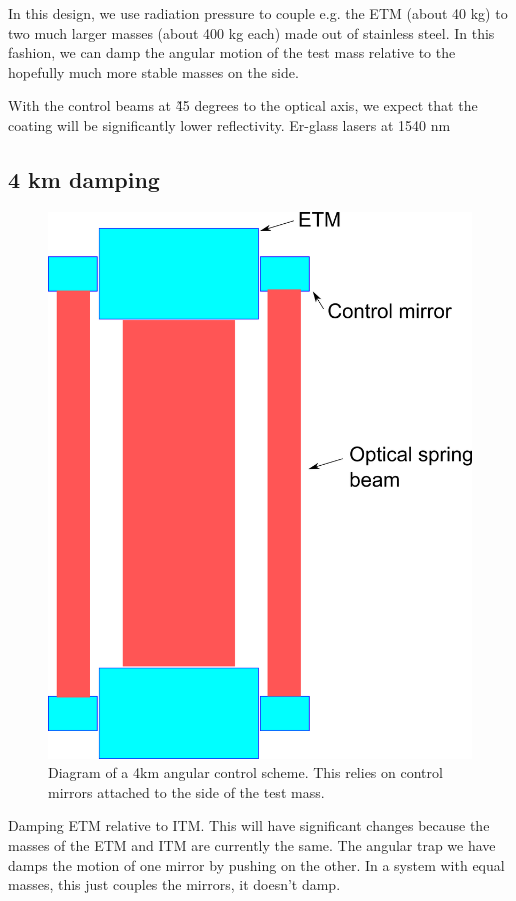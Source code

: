 In this design, we use radiation pressure to couple e.g. the ETM (about 40 kg) to two much larger masses (about 400 kg each) made out of stainless steel. In this fashion, we can damp the angular motion of the test mass relative to the hopefully much more stable masses on the side. 

With the control beams at \~ 45 degrees to the optical axis, we expect that the coating will be significantly lower reflectivity. Er-glass lasers at 1540 nm 

\subsection{4 km damping}

\begin{figure}[htp]%
\begin{center}
\includegraphics[width=.8\textwidth]{figures/application/longTrapDiagram}%
\caption[4 km angular control]{Diagram of a 4km angular control scheme. This relies on control mirrors attached to the side of the test mass.}%
\label{fig:longtrapdiagram}%
\end{center}
\end{figure}

Damping ETM relative to ITM. This will have significant changes because the masses of the ETM and ITM are currently the same. The angular trap we have damps the motion of one mirror by pushing on the other. In a system with equal masses, this just couples the mirrors, it doesn't damp. 

